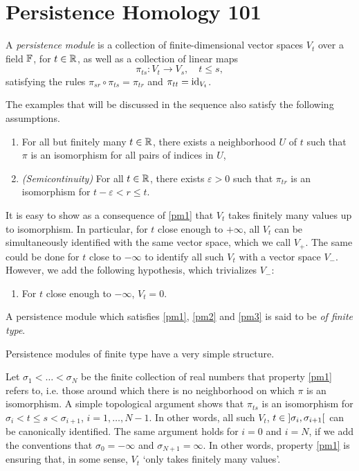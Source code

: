 \chapter{Persistence Homology 101}

\begin{definition}
A \emph{persistence module} is a collection of finite-dimensional vector spaces $V_t$ over a field $\mathbb{F}$, for $t \in \mathbb{R}$, as well as a collection of linear maps
\begin{equation}
\pi_{ts} \colon V_t \to V_s, \quad t\leq s,
\end{equation}
satisfying the rules $\pi_{sr} \circ \pi_{ts} = \pi_{tr}$ and $\pi_{tt} = \mathrm{id}_{V_t}$.

The examples that will be discussed in the sequence also satisfy the following assumptions.
\begin{enumerate}[label=\roman*)]
\item\label{pm1} For all but finitely many $t \in \mathbb{R}$, there exists a neighborhood $U$ of $t$ such that $\pi$ is an isomorphism for all pairs of indices in $U$,
\item\label{pm2} \textit{(Semicontinuity)} For all $t \in \mathbb{R}$, there exists $\varepsilon > 0$ such that $\pi_{tr}$ is an isomorphism for $t-\varepsilon < r \leq t$.
\end{enumerate}

It is easy to show as a consequence of \ref{pm1} that $V_t$ takes finitely many values up to isomorphism. In particular, for $t$ close enough to $+\infty$, all $V_t$ can be simultaneously identified with the same vector space, which we call $V_+$. The same could be done for $t$ close to $-\infty$ to identify all such $V_t$ with a vector space $V_-$. However, we add the following hypothesis, which trivializes $V_-$:

\begin{enumerate}[resume*]
\item\label{pm3} For $t$ close enough to $-\infty$, $V_t = 0$.
\end{enumerate}

A persistence module which satisfies \ref{pm1}, \ref{pm2} and \ref{pm3} is said to be \emph{of finite type}.
\end{definition}

Persistence modules of finite type have a very simple structure.

Let $\sigma_1 < \dots < \sigma_N$ be the finite collection of real numbers that property \ref{pm1} refers to, i.e. those around which there is no neighborhood on which $\pi$ is an isomorphism. A simple topological argument shows that $\pi_{ts}$ is an isomorphism for $\sigma_i < t \leq s < \sigma_{i+1}$, $i = 1, \dots, N-1$. In other words, all such $V_t$, $t \in \ointerval{\sigma_i}{\sigma_{i+1}}$ can be canonically identified. The same argument holds for $i = 0$ and $i = N$, if we add the conventions that $\sigma_0 = -\infty$ and $\sigma_{N+1} = \infty$. In other words, property \ref{pm1} is ensuring that, in some sense, $V_t$ `only takes finitely many values'.

